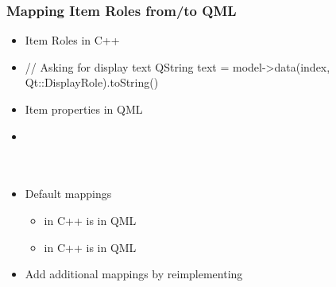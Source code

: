 \begin{slide}[fragile]{}\frametitle{Mapping Item Roles from/to QML}
  \begin{itemize}
      \item Item Roles in C++
      \item[]
      \begin{cpp}
// Asking for display text
QString text = model->data(index, Qt::DisplayRole).toString()
      \end{cpp}
      \vspace*{1.0em}
      \item Item properties in QML
      \item[]
      \begin{qml}
\\
\\
\qtt{\}}\\
      \end{qml}
      \item Default mappings
      \begin{itemize}
          \item {} in C++ is  in QML
          \item {} in C++ is  in QML
      \end{itemize}
      \item Add additional mappings by reimplementing 
  \end{itemize}
\end{slide}

